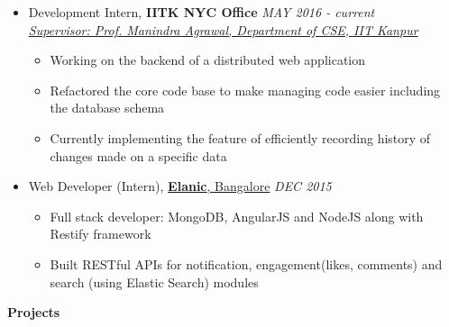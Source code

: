 \documentclass[letterpaper,11pt]{article}
\begin{document}
{\begin{itemize}
    \item Development Intern, \textbf{IITK NYC Office} \hfill \textit{MAY 2016 - current}\\
    \textit{\href{http://www.cse.iitk.ac.in/users/manindra/}{Supervisor: Prof. Manindra Agrawal, Department of CSE, IIT Kanpur}}
    \vspace{-4pt}
        \begin{itemize}
            \item Working on the backend of a distributed web application
             \vspace{-2pt}
            \item Refactored the core code base to make managing code easier including the database schema
             \vspace{-2pt}
            \item Currently implementing the feature of efficiently recording history of changes made on a specific data
             \vspace{-2pt}
        \end{itemize}
    \vspace{-5pt}
    \item Web Developer (Intern), \href{http://elanic.in//}{\textbf{Elanic}, Bangalore} \hfill \textit{DEC 2015}
        \vspace{-4pt}
        \begin{itemize}
            \item Full stack developer: MongoDB, AngularJS and NodeJS along with Restify framework
            \vspace{-2pt}
            \item Built RESTful APIs for notification, engagement(likes, comments) and search (using Elastic Search) modules
            \vspace{-2pt}
        \end{itemize}
\end{itemize}

\vspace{-1pt}
\Large{\textbf{Projects}}
\small
\vspace{-5pt}

}
\end{document}
